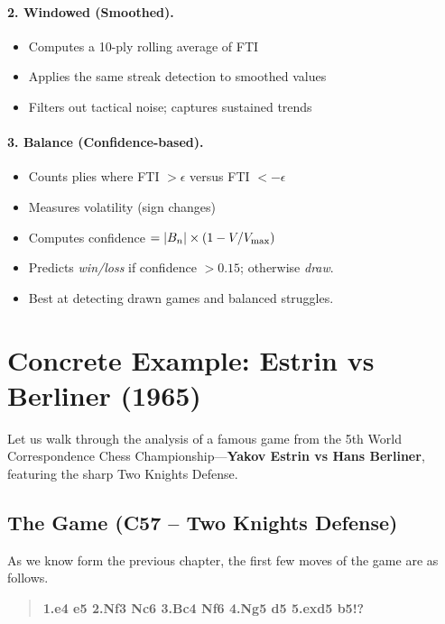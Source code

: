 \documentclass[12pt]{book}
\begin{document}
\paragraph{2. Windowed (Smoothed).}
\begin{itemize}
    \item Computes a 10-ply rolling average of FTI
    \item Applies the same streak detection to smoothed values
    \item Filters out tactical noise; captures sustained trends
\end{itemize}

\paragraph{3. Balance (Confidence-based).}
\begin{itemize}
    \item Counts plies where FTI $> \epsilon$ versus FTI $< -\epsilon$
    \item Measures volatility (sign changes)
    \item Computes confidence $= |B_n| \times (1 - V/V_{\rm max})$
    \item Predicts {\it win/loss} if confidence $> 0.15$; otherwise {\it draw}.
    \item Best at detecting drawn games and balanced struggles.
\end{itemize}

\section{Concrete Example: Estrin vs Berliner (1965)}

Let us walk through the analysis of a famous game from the 5th World Correspondence Chess Championship---\textbf{Yakov Estrin vs Hans Berliner}, featuring the sharp Two Knights Defense.

\subsection{The Game (C57 -- Two Knights Defense)}

As we know form the previous chapter, the first few moves of the game are
as follows.

\begin{quote}
{\bf 1.e4 e5 2.Nf3 Nc6 3.Bc4 Nf6 4.Ng5 d5 5.exd5 b5!?}
\end{quote}
\end{document}

